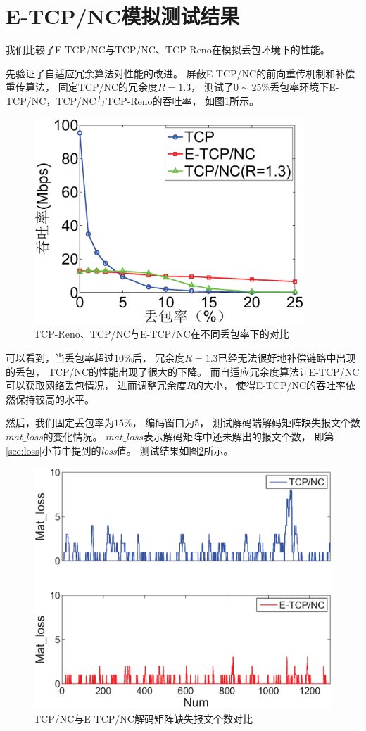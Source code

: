 \section{E-TCP/NC模拟测试结果}
我们比较了E-TCP/NC与TCP/NC、TCP-Reno在模拟丢包环境下的性能。
\par
先验证了自适应冗余算法对性能的改进。
屏蔽E-TCP/NC的前向重传机制和补偿重传算法，
固定TCP/NC的冗余度$R=1.3$，
测试了$0 \sim 25\%$丢包率环境下E-TCP/NC，TCP/NC与TCP-Reno的吞吐率，
如图\ref{fig:adap_redun}所示。
\begin{figure}[htbp]
	\centering
	\includegraphics[width=4in]{figures/adaptive_redundancy.eps}
	\caption{TCP-Reno、TCP/NC与E-TCP/NC在不同丢包率下的对比}
	\label{fig:adap_redun}
\end{figure}
\par
可以看到，当丢包率超过$10\%$后，
冗余度$R=1.3$已经无法很好地补偿链路中出现的丢包，
TCP/NC的性能出现了很大的下降。
而自适应冗余度算法让E-TCP/NC可以获取网络丢包情况，
进而调整冗余度\emph{R}的大小，
使得E-TCP/NC的吞吐率依然保持较高的水平。
\par
然后，我们固定丢包率为$15\%$，
编码窗口为5，
测试解码端解码矩阵缺失报文个数$mat\_loss$的变化情况。
$mat\_loss$表示解码矩阵中还未解出的报文个数，
即第\ref{sec:loss}小节中提到的\emph{loss}值。
测试结果如图\ref{fig:buchang}所示。
\begin{figure}[htbp]
	\centering
	\includegraphics[width=6in]{figures/buchang.eps}
	\caption{TCP/NC与E-TCP/NC解码矩阵缺失报文个数对比}
	\label{fig:buchang}
\end{figure}
